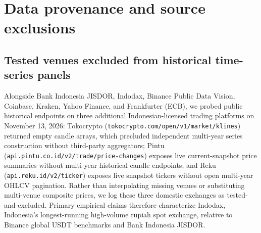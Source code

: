 \section{Data provenance and source exclusions}
\label{app:provenance}

\subsection{Tested venues excluded from historical time-series panels}
Alongside Bank Indonesia JISDOR, Indodax, Binance Public Data Vision, Coinbase, Kraken, Yahoo Finance, and Frankfurter (ECB), we probed public historical endpoints on three additional Indonesian-licensed trading platforms on November 13, 2026: Tokocrypto (\texttt{tokocrypto.com/open/v1/market/klines}) returned empty candle arrays, which precluded independent multi-year series construction without third-party aggregators; Pintu (\texttt{api.pintu.co.id/v2/trade/price-changes}) exposes live current-snapshot price summaries without multi-year historical candle endpoints; and Reku (\texttt{api.reku.id/v2/ticker}) exposes live snapshot tickers without open multi-year OHLCV pagination. Rather than interpolating missing venues or substituting multi-venue composite prices, we log these three domestic exchanges as tested-and-excluded. Primary empirical claims therefore characterize Indodax, Indonesia's longest-running high-volume rupiah spot exchange, relative to Binance global USDT benchmarks and Bank Indonesia JISDOR.
